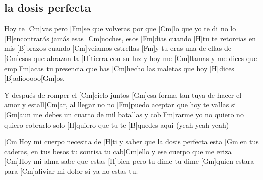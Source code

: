 \subsection*{la dosis perfecta   }
\begin{guitar}
Hoy te [Cm]vas   pero [Fm]se que volveras
por que [Cm]lo que yo te di no lo [H]encontrarás jamás 
esas [Cm]noches, esos [Fm]dias cuando [H]tu te retorcias
en mis [B]brazos cuando [Cm]veiamos estrellas [Fm]y tu eras
una de ellas de [Cm]esas que abrazan la [H]tierra con su luz
y hoy me [Cm]llamas y me dices que emp[Fm]acas tu presencia
que has [Cm]hecho las maletas que hoy [H]dices [B]adiooooo[Gm]os.



 Y después de romper el [Cm]cielo juntos [Gm]esa forma
tan tuya de hacer el amor y estall[Cm]ar, al llegar
no no [Fm]puedo aceptar que hoy te vallas si [Gm]aun me debes
un cuarto de mil batallas y cob[Fm]rarme yo no quiero
no quiero cobrarlo solo [H]quiero que tu te [B]quedes aqui (yeah yeah yeah)



[Cm]Hoy mi cuerpo necesita de [H]ti y saber que la dosis
perfecta esta [Gm]en tus caderas, en tus besos tu sonrisa
tu cab[Cm]ello y ese cuerpo que me eriza
[Cm]Hoy mi alma sabe que estas [H]bien pero tu dime tu
dime [Gm]quien estara para [Cm]aliviar mi dolor si ya no estas tu.
\end{guitar}
